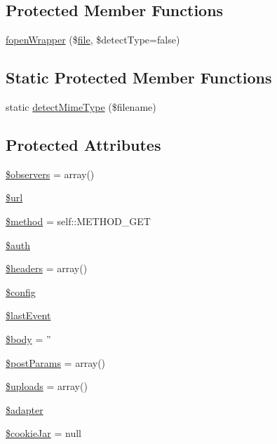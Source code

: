 \subsection*{Protected Member Functions}
\begin{DoxyCompactItemize}
\item 
\hyperlink{classHTTP__Request2_a1d4b42d63213562467f393e34c7a76dc}{fopen\-Wrapper} (\$\hyperlink{classfile}{file}, \$detect\-Type=false)
\end{DoxyCompactItemize}
\subsection*{Static Protected Member Functions}
\begin{DoxyCompactItemize}
\item 
static \hyperlink{classHTTP__Request2_ac1b8f0776d5faf41503d440350c8b6d6}{detect\-Mime\-Type} (\$filename)
\end{DoxyCompactItemize}
\subsection*{Protected Attributes}
\begin{DoxyCompactItemize}
\item 
\hyperlink{classHTTP__Request2_ab57c87d4bee6cb35be6b976a8ec7ec2f}{\$observers} = array()
\item 
\hyperlink{classHTTP__Request2_acf16b4d76ebd04a80dc8e140303ad895}{\$url}
\item 
\hyperlink{classHTTP__Request2_ae83c79d14f1b596d91b60862ea1370af}{\$method} = self\-::\-M\-E\-T\-H\-O\-D\-\_\-\-G\-E\-T
\item 
\hyperlink{classHTTP__Request2_a4c1219356a8c669730a1fe09bd8f81b1}{\$auth}
\item 
\hyperlink{classHTTP__Request2_a0d70f1b39d77f1e8bca7cd984d25192e}{\$headers} = array()
\item 
\hyperlink{classHTTP__Request2_a4043f1c6f00d8b92d2b3dcb5ecd2861e}{\$config}
\item 
\hyperlink{classHTTP__Request2_a53a051d2cfcad3fc688b7974c996e750}{\$last\-Event}
\item 
\hyperlink{classHTTP__Request2_af7de92496442c98589954db8327f9faf}{\$body} = ''
\item 
\hyperlink{classHTTP__Request2_a77aa571439401e1cd2adc407f4bdc222}{\$post\-Params} = array()
\item 
\hyperlink{classHTTP__Request2_ad95bfff299ff890d4f554754428337e5}{\$uploads} = array()
\item 
\hyperlink{classHTTP__Request2_a4de3f606051b53b314179271f9bd0173}{\$adapter}
\item 
\hyperlink{classHTTP__Request2_a1a4f35074ef955bfe726e85b76ed17a9}{\$cookie\-Jar} = null
\end{DoxyCompactItemize}


